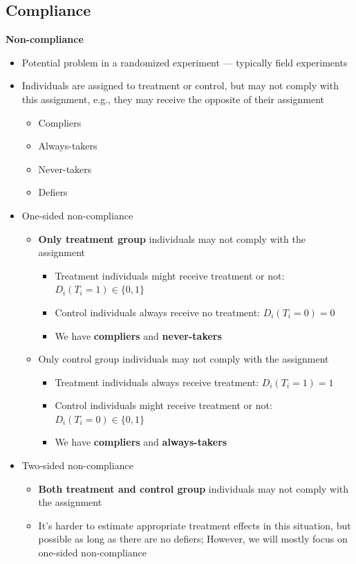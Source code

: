 \documentclass[10pt]{article}
\begin{document}
\subsection{Compliance}
\textbf{Non-compliance}
\begin{itemize}
    \item Potential problem in a randomized experiment --- typically field experiments 
    \item Individuals are assigned to treatment or control, but may not comply with this assignment, e.g., they may receive the opposite of their assignment
    \begin{itemize}
        \item Compliers
        \item Always-takers 
        \item Never-takers 
        \item Defiers
    \end{itemize}
    \item One-sided non-compliance 
    \begin{itemize}
        \item \textbf{Only treatment group} individuals may not comply with the assignment 
        \begin{itemize}
            \item Treatment individuals might receive treatment or not: $D_i(T_i = 1)\in \{0, 1\}  $
            \item Control individuals always receive no treatment: $D_i(T_i = 0) = 0 $
            \item We have \textbf{compliers} and \textbf{never-takers}
        \end{itemize}
        \item Only control group individuals may not comply with the assignment 
        \begin{itemize}
            \item Treatment individuals always receive treatment: $D_i(T_i = 1) = 1$
            \item Control individuals might receive treatment or not: $D_i(T_i = 0)\in \{0, 1\}  $
            \item We have \textbf{compliers} and \textbf{always-takers}
        \end{itemize}
    \end{itemize}
    \item Two-sided non-compliance 
    \begin{itemize}
        \item \textbf{Both treatment and control group} individuals may not comply with the assignment
        \item It's harder to estimate appropriate treatment effects in this situation, but possible as long as there are no defiers; However, we will mostly focus on one-sided non-compliance
    \end{itemize}
\end{itemize}
\end{document}
